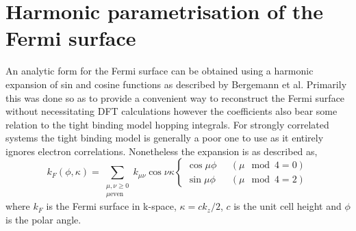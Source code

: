 
\section{Harmonic parametrisation of the Fermi surface}
    \label{Sec:ResD:TightBindingFits}

An analytic form for the Fermi surface can be obtained using a harmonic expansion of sin and cosine functions as described by Bergemann et al\cite{Bergemann2000}. Primarily this was done so as to provide a convenient way to reconstruct the Fermi surface without necessitating DFT calculations however the coefficients also bear some relation to the tight binding model hopping integrals. For strongly correlated systems the tight binding model is generally a poor one to use as it entirely ignores electron correlations. Nonetheless the expansion is as described as,
\begin{equation}
\label{Eqn:ResD:HarmonicExpansion}
k_F(\phi, \kappa) = \sum_{\substack{\mu,\nu \geq 0 \\ \mu \textrm{even}}}
    k_{\mu\nu}\cos\nu\kappa 
    \begin{cases}
        \cos{\mu\phi} \hspace{8pt} &(\mu\mod4 = 0) \\
        \sin{\mu\phi} \hspace{8pt} &(\mu\mod4 = 2)
    \end{cases}
\end{equation}
where $k_F$ is the Fermi surface in k-space, $\kappa = ck_z/2$, $c$ is the unit cell height and $\phi$ is the polar angle.

